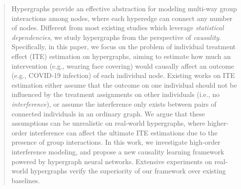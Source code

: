 \documentclass[sigconf]{acmart}
\begin{document}
\begin{abstract}
Hypergraphs provide an effective abstraction for modeling multi-way group interactions among nodes, where each hyperedge can connect any number of nodes. Different from most existing studies which leverage \textit{statistical dependencies}, we study hypergraphs from the perspective of \textit{causality}. Specifically, in this paper, we focus on the problem of individual treatment effect (ITE) estimation on hypergraphs, aiming to estimate how much an intervention {(e.g., wearing face covering)}
would causally affect an outcome {(e.g., COVID-19 infection)} of each individual node. Existing works on ITE estimation either assume that the outcome on one individual should not be influenced by the treatment assignments on other individuals (i.e., no \textit{interference}), or assume the interference only exists between pairs of connected individuals in an ordinary graph. We argue that these assumptions can be unrealistic on real-world hypergraphs, where higher-order interference can affect the ultimate ITE estimations due to the presence of group interactions. 
In this work, we investigate high-order interference modeling, and propose a new causality learning framework powered by hypergraph neural networks. Extensive experiments on real-world hypergraphs verify the superiority of our framework over  existing baselines. 
\vspace{-2mm}
\end{abstract}
\end{document}
